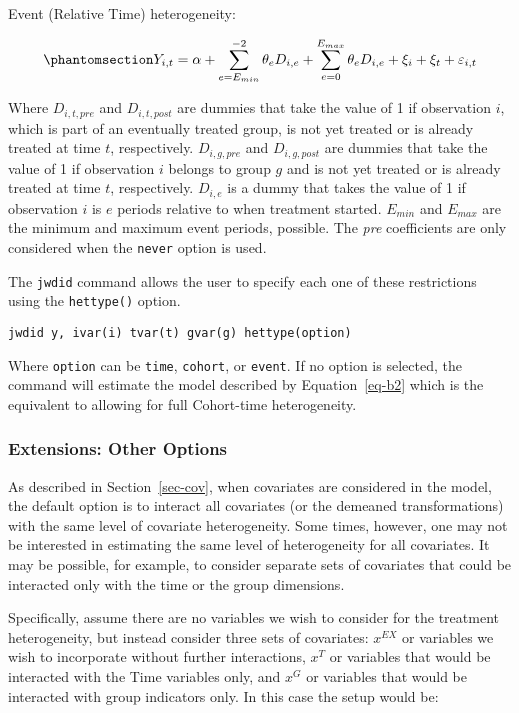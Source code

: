 \documentclass[
  letterpaper,
  DIV=11,
  numbers=noendperiod]{scrartcl}
\begin{document}
Event (Relative Time) heterogeneity:

\begin{equation}\phantomsection\label{eq-ht3}{Y_{i,t} = \alpha +  \sum_{e = E_{min}}^{-2} \theta_{e} D_{i,e}+ \sum_{e = 0}^{E_{max}} \theta_{e} D_{i,e} + \xi_i + \xi_t+\varepsilon_{i,t}
}\end{equation}

Where \(D_{i,t,pre}\) and \(D_{i,t,post}\) are dummies that take the
value of 1 if observation \(i\), which is part of an eventually treated
group, is not yet treated or is already treated at time \(t\),
respectively. \(D_{i,g,pre}\) and \(D_{i,g,post}\) are dummies that take
the value of 1 if observation \(i\) belongs to group \(g\) and is not
yet treated or is already treated at time \(t\), respectively.
\(D_{i,e}\) is a dummy that takes the value of 1 if observation \(i\) is
\(e\) periods relative to when treatment started. \(E_{min}\) and
\(E_{max}\) are the minimum and maximum event periods, possible. The
\emph{pre} coefficients are only considered when the \texttt{never}
option is used.

The \texttt{jwdid} command allows the user to specify each one of these
restrictions using the \texttt{hettype()} option.

\texttt{jwdid\ y,\ ivar(i)\ tvar(t)\ gvar(g)\ hettype(option)}

Where \texttt{option} can be \texttt{time}, \texttt{cohort}, or
\texttt{event}. If no option is selected, the command will estimate the
model described by Equation~\ref{eq-b2} which is the equivalent to
allowing for full Cohort-time heterogeneity.

\subsubsection{Extensions: Other
Options}\label{extensions-other-options}

As described in Section~\ref{sec-cov}, when covariates are considered in
the model, the default option is to interact all covariates (or the
demeaned transformations) with the same level of covariate
heterogeneity. Some times, however, one may not be interested in
estimating the same level of heterogeneity for all covariates. It may be
possible, for example, to consider separate sets of covariates that
could be interacted only with the time or the group dimensions.

Specifically, assume there are no variables we wish to consider for the
treatment heterogeneity, but instead consider three sets of covariates:
\(x^{EX}\) or variables we wish to incorporate without further
interactions, \(x^{T}\) or variables that would be interacted with the
Time variables only, and \(x^{G}\) or variables that would be interacted
with group indicators only. In this case the setup would be:
\end{document}
